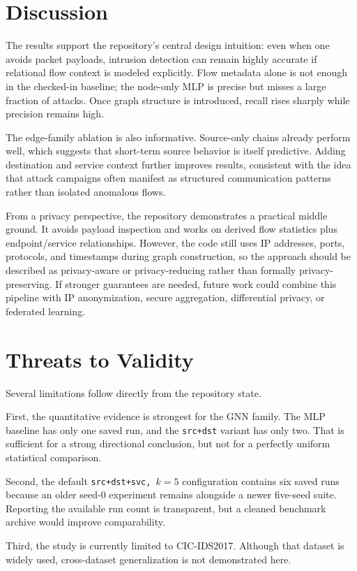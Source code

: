 \documentclass[conference]{IEEEtran}
\begin{document}
\section{Discussion}
The results support the repository's central design intuition: even when one avoids packet payloads, intrusion detection can remain highly accurate if relational flow context is modeled explicitly. Flow metadata alone is not enough in the checked-in baseline; the node-only MLP is precise but misses a large fraction of attacks. Once graph structure is introduced, recall rises sharply while precision remains high.

The edge-family ablation is also informative. Source-only chains already perform well, which suggests that short-term source behavior is itself predictive. Adding destination and service context further improves results, consistent with the idea that attack campaigns often manifest as structured communication patterns rather than isolated anomalous flows.

From a privacy perspective, the repository demonstrates a practical middle ground. It avoids payload inspection and works on derived flow statistics plus endpoint/service relationships. However, the code still uses IP addresses, ports, protocols, and timestamps during graph construction, so the approach should be described as privacy-aware or privacy-reducing rather than formally privacy-preserving. If stronger guarantees are needed, future work could combine this pipeline with IP anonymization, secure aggregation, differential privacy, or federated learning.

\section{Threats to Validity}
Several limitations follow directly from the repository state.

First, the quantitative evidence is strongest for the GNN family. The MLP baseline has only one saved run, and the \texttt{src+dst} variant has only two. That is sufficient for a strong directional conclusion, but not for a perfectly uniform statistical comparison.

Second, the default \texttt{src+dst+svc, $k=5$} configuration contains six saved runs because an older seed-0 experiment remains alongside a newer five-seed suite. Reporting the available run count is transparent, but a cleaned benchmark archive would improve comparability.

Third, the study is currently limited to CIC-IDS2017. Although that dataset is widely used, cross-dataset generalization is not demonstrated here.
\end{document}
